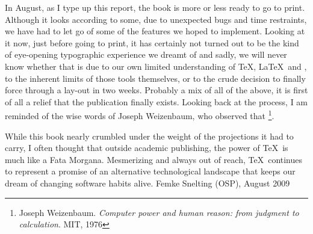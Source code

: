In August, as I type up this report, the book is more or less ready to
go to print. Although it looks
 according to some, due to
unexpected bugs and time restraints, we have had to let go of some of
the features we hoped to implement. Looking at it now, just before
going to print, it has certainly not turned out to be the kind of
eye-opening typographic experience we dreamt of and sadly, we will
never know whether that is due to our own limited understanding of \TeX,
\LaTeX\ and \ConTeXt, to the inherent limits of those tools themselves, or
to the crude decision to finally force through a lay-out in two weeks.
Probably a mix of all of the above, it is first of all a relief that
the publication finally exists. Looking back at the process, I am
reminded of the wise words of Joseph Weizenbaum, who observed that
\footnote{Joseph Weizenbaum.
{\em Computer power and human reason: from judgment to calculation}.
MIT, 1976}.

While this book nearly crumbled under the weight of the
projections it had to carry, I often thought that outside academic
publishing, the power of \TeX\ is much like a Fata Morgana. Mesmerizing
and always out of reach, \TeX\ continues to represent a promise of an
alternative technological landscape that keeps our dream of changing
software habits alive.
\blank
\blank
Femke Snelting (OSP), August 2009

